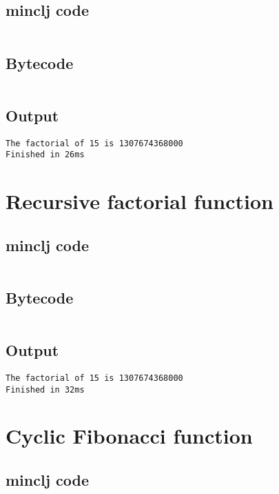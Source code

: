 \documentclass[11pt]{scrreprt}
\begin{document}
\subsection{minclj code}
\inputminted{clojure}{/home/mario/git/MarioJim/miniclj/examples/cyclic_factorial.clj}

\subsection{Bytecode}
\inputminted{text}{/home/mario/git/MarioJim/miniclj/examples/cyclic_factorial.mclj}

\subsection{Output}
\begin{verbatim}
The factorial of 15 is 1307674368000
Finished in 26ms
\end{verbatim}


\section{Recursive factorial function}
\subsection{minclj code}
\inputminted{clojure}{/home/mario/git/MarioJim/miniclj/examples/recursive_factorial.clj}

\subsection{Bytecode}
\inputminted{text}{/home/mario/git/MarioJim/miniclj/examples/recursive_factorial.mclj}

\subsection{Output}
\begin{verbatim}
The factorial of 15 is 1307674368000
Finished in 32ms
\end{verbatim}


\section{Cyclic Fibonacci function}
\subsection{minclj code}
\inputminted{clojure}{/home/mario/git/MarioJim/miniclj/examples/cyclic_fibonacci.clj}
\end{document}
